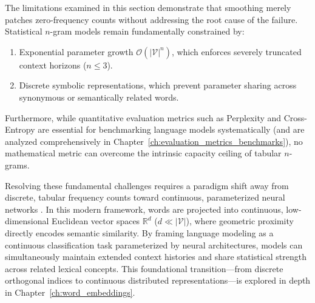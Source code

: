 \documentclass[../../../main.tex]{subfiles}
\begin{document}
The limitations examined in this section demonstrate that smoothing merely patches zero-frequency counts without addressing the root cause of the failure. Statistical $n$-gram models remain fundamentally constrained by:
\begin{enumerate}
    \item Exponential parameter growth $\mathcal{O}(|\mathcal{V}|^n)$, which enforces severely truncated context horizons ($n \le 3$).
    \item Discrete symbolic representations, which prevent parameter sharing across synonymous or semantically related words.
\end{enumerate}

Furthermore, while quantitative evaluation metrics such as Perplexity and Cross-Entropy are essential for benchmarking language models systematically (and are analyzed comprehensively in Chapter~\ref{ch:evaluation_metrics_benchmarks}), no mathematical metric can overcome the intrinsic capacity ceiling of tabular $n$-grams.

Resolving these fundamental challenges requires a paradigm shift away from discrete, tabular frequency counts toward continuous, parameterized neural networks \citep{bengio2003}. In this modern framework, words are projected into continuous, low-dimensional Euclidean vector spaces $\mathbb{R}^d$ ($d \ll |\mathcal{V}|$), where geometric proximity directly encodes semantic similarity. By framing language modeling as a continuous classification task parameterized by neural architectures, models can simultaneously maintain extended context histories and share statistical strength across related lexical concepts. This foundational transition---from discrete orthogonal indices to continuous distributed representations---is explored in depth in Chapter~\ref{ch:word_embeddings}.

\clearpage\thispagestyle{empty}\null\clearpage
\end{document}
